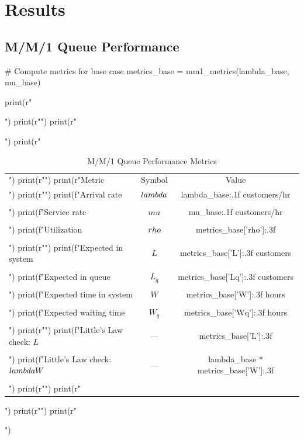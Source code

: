 \documentclass[a4paper, 11pt]{article}
\begin{document}
\section{Results}

\subsection{M/M/1 Queue Performance}

\begin{pycode}
# Compute metrics for base case
metrics_base = mm1_metrics(lambda_base, mu_base)

print(r"\begin{table}[htbp]")
print(r"\centering")
print(r"\caption{M/M/1 Queue Performance Metrics}")
print(r"\begin{tabular}{lcc}")
print(r"\toprule")
print(r"Metric & Symbol & Value \\")
print(r"\midrule")
print(f"Arrival rate & $\\lambda$ & {lambda_base:.1f} customers/hr \\\\")
print(f"Service rate & $\\mu$ & {mu_base:.1f} customers/hr \\\\")
print(f"Utilization & $\\rho$ & {metrics_base['rho']:.3f} \\\\")
print(r"\midrule")
print(f"Expected in system & $L$ & {metrics_base['L']:.3f} customers \\\\")
print(f"Expected in queue & $L_q$ & {metrics_base['Lq']:.3f} customers \\\\")
print(f"Expected time in system & $W$ & {metrics_base['W']:.3f} hours \\\\")
print(f"Expected waiting time & $W_q$ & {metrics_base['Wq']:.3f} hours \\\\")
print(r"\midrule")
print(f"Little's Law check: $L$ & --- & {metrics_base['L']:.3f} \\\\")
print(f"Little's Law check: $\\lambda W$ & --- & {lambda_base * metrics_base['W']:.3f} \\\\")
print(r"\bottomrule")
print(r"\end{tabular}")
print(r"\label{tab:mm1}")
print(r"\end{table}")
\end{pycode}
\end{document}
